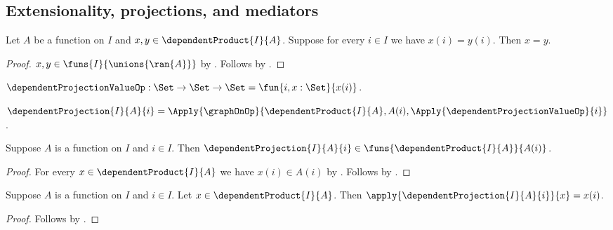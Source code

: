 \subsection{Extensionality, projections, and mediators}

\begin{proposition}\label{dependent_product_extensionality}
    Let $A$ be a function on $I$ and $x,y\in\dependentProduct{I}{A}$.
    Suppose for every $i\in I$ we have $x(i)=y(i)$.
    Then $x=y$.
\end{proposition}
\begin{proof}
    $x,y\in\funs{I}{\unions{\ran{A}}}$ by
        .
    Follows by .
\end{proof}

\begin{definition}\label{dependent_projection_value_op}
    $\dependentProjectionValueOp:\Set\to\Set\to\Set
        =\fun{i,x:\Set}{x(i)}$.
\end{definition}

\begin{definition}\label{dependent_projection}
    $\dependentProjection{I}{A}{i}
        =\Apply{\graphOnOp}{
            \dependentProduct{I}{A},A(i),
            \Apply{\dependentProjectionValueOp}{i}}$.
\end{definition}

\begin{proposition}\label{dependent_projection_type}
    Suppose $A$ is a function on $I$ and $i\in I$.
    Then
        $\dependentProjection{I}{A}{i}\in
            \funs{\dependentProduct{I}{A}}{A(i)}$.
\end{proposition}
\begin{proof}
    For every $x\in\dependentProduct{I}{A}$ we have $x(i)\in A(i)$ by
        .
    Follows by
        .
\end{proof}

\begin{proposition}\label{dependent_projection_apply}
    Suppose $A$ is a function on $I$ and $i\in I$.
    Let $x\in\dependentProduct{I}{A}$.
    Then $\apply{\dependentProjection{I}{A}{i}}{x}=x(i)$.
\end{proposition}
\begin{proof}
    Follows by
        .
\end{proof}

